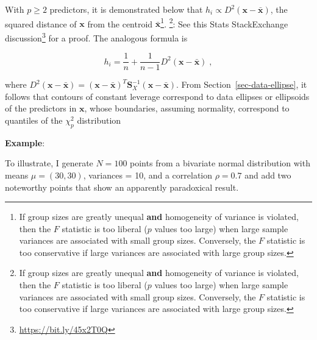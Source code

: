 \documentclass[
  letterpaper,
  10pt,
  krantz2]{krantz}
\providecommand{\href}[2]{#2\footnote{\url{#1}}}
\begin{document}
With \(p \ge 2\) predictors, it is demonstrated below that
\(h_i \propto D^2 (\mathbf{x} - \bar{\mathbf{x}})\), the squared
distance of \(\mathbf{x}\) from the centroid
\(\bar{\mathbf{x}}\)\footnote{If group sizes are greatly unequal
  \textbf{and} homogeneity of variance is violated, then the \(F\)
  statistic is too liberal (\(p\) values too large) when large sample
  variances are associated with small group sizes. Conversely, the \(F\)
  statistic is too conservative if large variances are associated with
  large group sizes.}. \footnote{If group sizes are greatly unequal
  \textbf{and} homogeneity of variance is violated, then the \(F\)
  statistic is too liberal (\(p\) values too large) when large sample
  variances are associated with small group sizes. Conversely, the \(F\)
  statistic is too conservative if large variances are associated with
  large group sizes.}: See \href{https://bit.ly/45x2T0Q}{this Stats
StackExchange discussion} for a proof. The analogous formula is

\[
h_i = \frac{1}{n} + \frac{1}{n-1} D^2 (\mathbf{x} - \bar{\mathbf{x}}) \; ,
\]

where
\(D^2 (\mathbf{x} - \bar{\mathbf{x}}) = (\mathbf{x} - \bar{\mathbf{x}})^T \mathbf{S}_X^{-1} (\mathbf{x} - \bar{\mathbf{x}})\).
From Section~\ref{sec-data-ellipse}, it follows that contours of
constant leverage correspond to data ellipses or ellipsoids of the
predictors in \(\mathbf{x}\), whose boundaries, assuming normality,
correspond to quantiles of the \(\chi^2_p\) distribution

\textbf{Example}:

To illustrate, I generate \(N = 100\) points from a bivariate normal
distribution with means \(\mu = (30, 30)\), variances = 10, and a
correlation \(\rho = 0.7\) and add two noteworthy points that show an
apparently paradoxical result.
\end{document}
